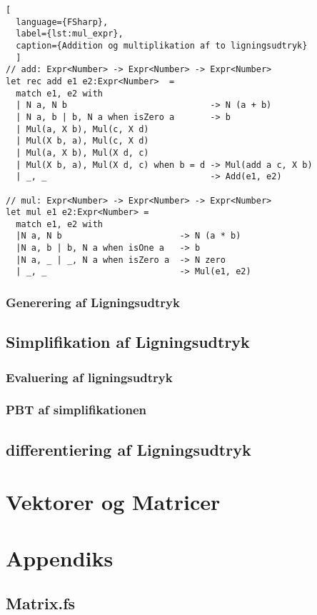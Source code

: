 \documentclass{article}
\begin{document}
\begin{lstlisting}[
  language={FSharp}, 
  label={lst:mul_expr}, 
  caption={Addition og multiplikation af to ligningsudtryk}
  ]
// add: Expr<Number> -> Expr<Number> -> Expr<Number>
let rec add e1 e2:Expr<Number>  =
  match e1, e2 with
  | N a, N b                            -> N (a + b)
  | N a, b | b, N a when isZero a       -> b
  | Mul(a, X b), Mul(c, X d) 
  | Mul(X b, a), Mul(c, X d)
  | Mul(a, X b), Mul(X d, c) 
  | Mul(X b, a), Mul(X d, c) when b = d -> Mul(add a c, X b)  
  | _, _                                -> Add(e1, e2)

// mul: Expr<Number> -> Expr<Number> -> Expr<Number>
let mul e1 e2:Expr<Number> =
  match e1, e2 with
  |N a, N b                       -> N (a * b)
  |N a, b | b, N a when isOne a   -> b
  |N a, _ | _, N a when isZero a  -> N zero
  | _, _                          -> Mul(e1, e2)
\end{lstlisting}


\subsubsection{Generering af Ligningsudtryk}\label{sec:expression_generation}
    
\subsection{Simplifikation af Ligningsudtryk} \label{sec:simplification_expression}
\subsubsection{Evaluering af ligningsudtryk}
\subsubsection{PBT af simplifikationen} %

\subsection{differentiering af Ligningsudtryk}

\section{Vektorer og Matricer}


\section{Appendiks}
\subsection{Matrix.fs} \label{sec:matrix.fs}
\newpage
\printbibliography
\end{document}
